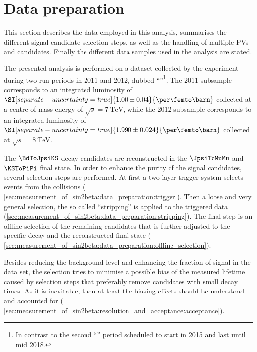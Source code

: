 
\section{Data preparation}
\label{sec:measurement_of_sin2beta:data_preparation}

This section describes the data employed in this analysis, summarises the
different signal candidate selection steps, as well as the handling of multiple
\acp{PV} and \Bmeson candidates. Finally the different data samples used in the
analysis are stated.

The presented analysis is performed on a dataset collected by the \LHCb
experiment during two run periods in 2011 and 2012, dubbed
\enquote{\RunOne{}}\footnote{In contrast to the second \enquote{\RunTwo{}} period
scheduled to start in 2015 and last until mid 2018.}. The 2011 subsample
corresponds to an integrated luminosity of
$\SI[separate-uncertainty=true]{1.00\pm0.04}{\per\femto\barn}$ collected at a
centre-of-mass energy of $\sqrt{s}=\SI{7}{\TeV}$, while the 2012 subsample
corresponds to an integrated luminosity of
$\SI[separate-uncertainty=true]{1.990\pm0.024}{\per\femto\barn}$ collected at
$\sqrt{s}=\SI{8}{\TeV}$.

The $\BdToJpsiKS$ decay candidates are reconstructed in the $\JpsiToMuMu$ and
$\KSToPiPi$ final state. In order to enhance the purity of the signal
candidates, several selection steps are performed. At first a two-layer
trigger system selects events from the \protonproton collisions (\cf
\cref{sec:measurement_of_sin2beta:data_preparation:trigger}). Then a loose and very general
selection, the so called \enquote{stripping} is applied to the triggered data
(\cf \cref{sec:measurement_of_sin2beta:data_preparation:stripping}). The final
step is an offline selection of the remaining candidates that is further
adjusted to the specific decay and the reconstructed final state (\cf
\cref{sec:measurement_of_sin2beta:data_preparation:offline_selection}).

Besides reducing the background level and enhancing the fraction of signal in
the data set, the selection tries to minimise a possible bias of the measured
\Bd lifetime caused by selection steps that preferably remove candidates with
small decay times. As it is inevitable, then at least the biasing effects should
be understood and accounted for (\cf
\cref{sec:measurement_of_sin2beta:resolution_and_acceptance:acceptance}).

